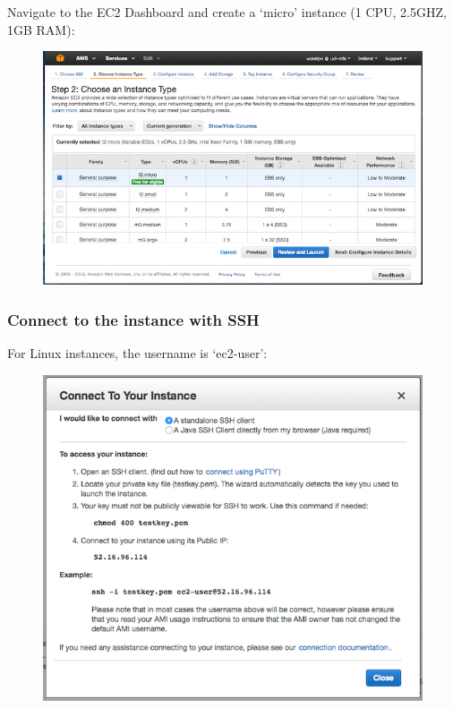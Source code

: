 Navigate to the EC2 Dashboard and create a `micro' instance (1 CPU,
2.5GHZ, 1GB RAM):

\begin{figure}[htbp]
\centering
\includegraphics{96Cloud/figures/create_ec2_instance.png}
\end{figure}

\subsubsection{Connect to the instance with
SSH}\label{connect-to-the-instance-with-ssh}

For Linux instances, the username is `ec2-user':

\begin{Shaded}
\begin{Highlighting}[]
\NormalTok{$ } \KeywordTok{<}\KeywordTok{>} \KeywordTok{<}\KeywordTok{>}
\end{Highlighting}
\end{Shaded}

\begin{figure}[htbp]
\centering
\includegraphics{96Cloud/figures/connect_to_instance.png}
\end{figure}

